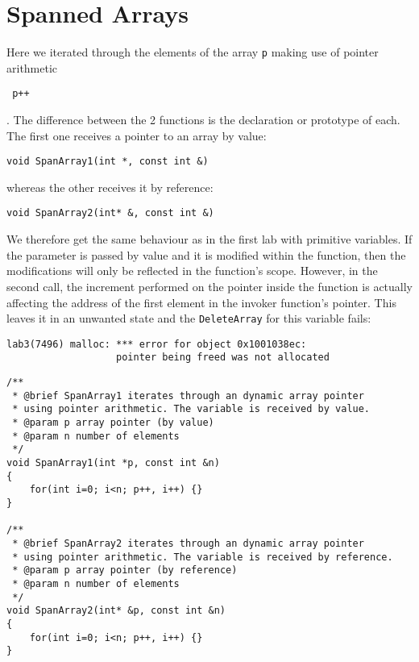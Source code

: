 \documentclass{article}
\begin{document}
\section{Spanned Arrays}

Here we iterated through the elements of the array \verb+p+  making use of
pointer arithmetic \begin{verbatim} p++ \end{verbatim}.
The difference between the 2 functions is the declaration or prototype of each.
The first one receives a pointer to an array by value:

\begin{verbatim}
void SpanArray1(int *, const int &)
\end{verbatim} 

whereas the other receives it by reference:
\begin{verbatim}
void SpanArray2(int* &, const int &)
\end{verbatim} 

We therefore get the same behaviour as in the first lab with primitive variables.
If the parameter is passed by value and it is modified within the function, then
the modifications will only be reflected in the function's scope. However, in the 
second call, the increment performed on the pointer inside the function is actually
affecting the address of the first element in the invoker function's pointer. This
leaves it in an unwanted state and the \verb+DeleteArray+ for this variable fails:

\begin{verbatim}
lab3(7496) malloc: *** error for object 0x1001038ec: 
                   pointer being freed was not allocated
\end{verbatim} 

\begin{lstlisting}[label=lbl_2,caption=Span Array]
/**
 * @brief SpanArray1 iterates through an dynamic array pointer
 * using pointer arithmetic. The variable is received by value.
 * @param p array pointer (by value)
 * @param n number of elements
 */
void SpanArray1(int *p, const int &n)
{
	for(int i=0; i<n; p++, i++) {}
}

/**
 * @brief SpanArray2 iterates through an dynamic array pointer
 * using pointer arithmetic. The variable is received by reference.
 * @param p array pointer (by reference)
 * @param n number of elements
 */
void SpanArray2(int* &p, const int &n)
{
	for(int i=0; i<n; p++, i++) {}
}
\end{lstlisting} 
\end{document}
